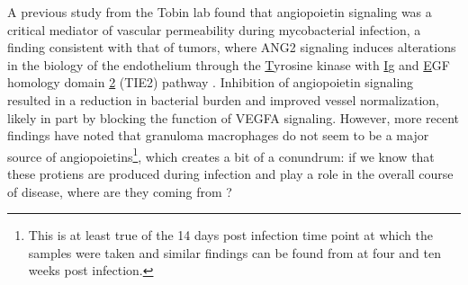 A previous study from the Tobin lab found that angiopoietin signaling was a critical mediator of vascular permeability during mycobacterial infection, a finding consistent with that of tumors, where ANG2 signaling induces alterations in the biology of the endothelium through the \underline{T}yrosine kinase with \underline{I}g and \underline{E}GF homology domain \underline{2} (TIE2) pathway \citep{Oehlers2017, Duran2021, Goel2012, Thurston2012}. Inhibition of angiopoietin signaling resulted in a reduction in bacterial burden and improved vessel normalization, likely in part by blocking the function of VEGFA signaling. However, more recent findings have noted that granuloma macrophages do not seem to be a major source of angiopoietins\footnote{This is at least true of the 14 days post infection time point at which the samples were taken and similar findings can be found from \citet{Gideon2022} at four and ten weeks post infection.}, which creates a bit of a conundrum: if we know that these protiens are produced during infection and play a role in the overall course of disease, where are they coming from \citep{Cronan2021}?

